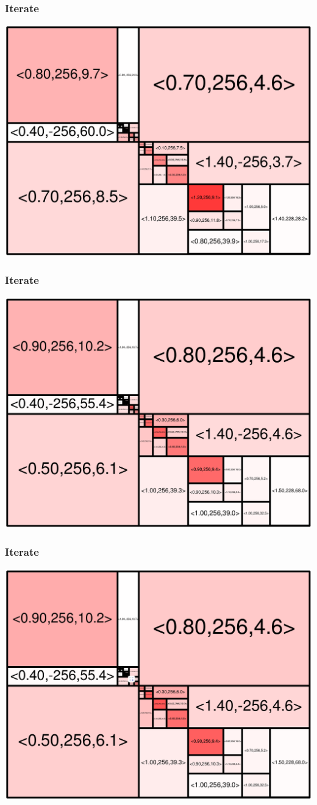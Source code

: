 \begin{frame}
\frametitle{Iterate}\begin{centering}\includegraphics[width=8.5 cm]{remy-graph/graph/test45.pdf}

\end{centering}\end{frame}


\begin{frame}
\frametitle{Iterate}\begin{centering}\includegraphics[width=8.5 cm]{remy-graph/graph/test46.pdf}

\end{centering}\end{frame}


\begin{frame}
\frametitle{Iterate}\begin{centering}\includegraphics[width=8.5 cm]{remy-graph/graph/test47.pdf}

\end{centering}\end{frame}


